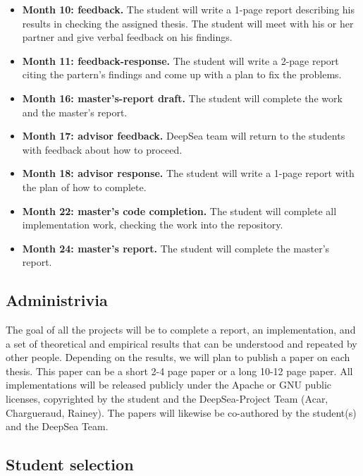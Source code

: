 \documentclass[11pt]{article}
\begin{document}
\begin{itemize}
\item {\bf Month 10: feedback.}  The student will write a
  1-page report describing his results in checking the assigned
  thesis.  The student will meet with his or her partner and give
  verbal feedback on his findings.

\item {\bf Month 11: feedback-response.}  The student will
  write a 2-page report citing the partern's findings and come up with
  a plan to fix the problems.

\item {\bf Month 16: master's-report draft.}  The student will complete the
  work and the master's report.

\item {\bf Month 17: advisor feedback.}  DeepSea team will return to
  the students with feedback about how to proceed.

\item {\bf Month 18: advisor response.} The student will write a
  1-page report with the plan of how to complete.

\item {\bf Month 22: master's code completion.} The student will
  complete all implementation work, checking the work into the
  repository.

\item {\bf Month 24: master's report.} The student will complete the
  master's report.
\end{itemize}


\subsection{Administrivia}

The goal of all the projects will be to complete a report, an
implementation, and a set of theoretical and empirical results that
can be understood and repeated by other people.  Depending on the
results, we will plan to publish a paper on each thesis.  This paper
can be a short 2-4 page paper or a long 10-12 page paper.  All
implementations will be released publicly under the Apache or GNU
public licenses, copyrighted by the student and the DeepSea-Project
Team (Acar, Chargueraud, Rainey).  The papers will likewise be
co-authored by the student(s) and the DeepSea Team.

\subsection{Student selection}
\end{document}
